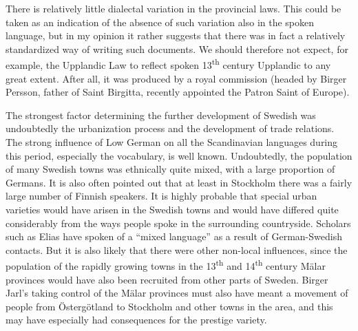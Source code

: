There is relatively little dialectal variation in the provincial laws. This could be taken as an indication of the absence of such variation also in the spoken language, but in my opinion it rather suggests that there was in fact a relatively standardized way of writing such documents. We should therefore not expect, for example, the Upplandic Law to reflect spoken 13\textsuperscript{th} century Upplandic to any great extent. After all, it was produced by a royal commission (headed by Birger Persson, father of Saint Birgitta, recently appointed the Patron Saint of Europe). 

The strongest factor determining the further development of Swedish was undoubtedly the urbanization process and the development of trade relations. The strong influence of Low German on all the Scandinavian languages during this period, especially the vocabulary, is well known. Undoubtedly, the population of many Swedish towns was ethnically quite mixed, with a large proportion of Germans. It is also often pointed out that at least in Stockholm there was a fairly large number of Finnish speakers. It is highly probable that special urban varieties would have arisen in the Swedish towns and would have differed quite considerably from the ways people spoke in the surrounding countryside. Scholars such as Elias \citet{Wessén1954} have spoken of a “mixed language” as a result of German-Swedish contacts. But it is also likely that there were other non-local influences, since the population of the rapidly growing towns in the 13\textsuperscript{th} and 14\textsuperscript{th} century Mälar provinces would have also been recruited from other parts of Sweden. Birger Jarl’s taking control of the Mälar provinces must also have meant a movement of people from Östergötland to Stockholm and other towns in the area, and this may have especially had consequences for the prestige variety.

